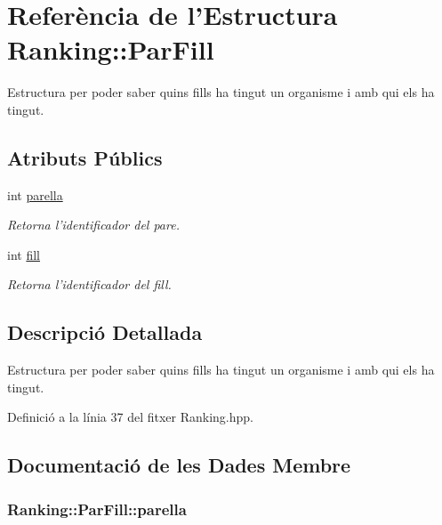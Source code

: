 \hypertarget{struct_ranking_1_1_par_fill}{\section{Referència de l'Estructura Ranking\-:\-:Par\-Fill}
\label{struct_ranking_1_1_par_fill}
}


Estructura per poder saber quins fills ha tingut un organisme i amb qui els ha tingut.  


\subsection*{Atributs Públics}
\begin{DoxyCompactItemize}
\item 
int \hyperlink{struct_ranking_1_1_par_fill_a73b7b596d987abbf7f27026317b5a85c}{parella}
\begin{DoxyCompactList}\small\item\em Retorna l'identificador del pare. \end{DoxyCompactList}\item 
int \hyperlink{struct_ranking_1_1_par_fill_a3b20e448cd957e593268c84368529b05}{fill}
\begin{DoxyCompactList}\small\item\em Retorna l'identificador del fill. \end{DoxyCompactList}\end{DoxyCompactItemize}


\subsection{Descripció Detallada}
Estructura per poder saber quins fills ha tingut un organisme i amb qui els ha tingut. 

Definició a la línia 37 del fitxer Ranking.\-hpp.



\subsection{Documentació de les Dades Membre}
\hypertarget{struct_ranking_1_1_par_fill_a73b7b596d987abbf7f27026317b5a85c}{
\subsubsection[{parella}]{\setlength{\rightskip}{0pt plus 5cm}Ranking\-::\-Par\-Fill\-::parella}}\label{struct_ranking_1_1_par_fill_a73b7b596d987abbf7f27026317b5a85c}



